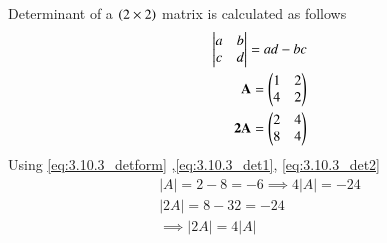 
 Determinant of a $\left(2 \times 2\right)$ matrix is calculated as follows
\begin{align}
\begin{vmatrix} a & b \\ c & d \end{vmatrix} = ad-bc
\label{eq:3.10.3_detform}
\\
\mathbf{A}=\begin{pmatrix}1&2\\4&2\end{pmatrix}
\label{eq:3.10.3_det1}
\\
\mathbf{2A}=\begin{pmatrix}2&4\\8&4\end{pmatrix}
\label{eq:3.10.3_det2}
\end{align}
Using \eqref{eq:3.10.3_detform} ,\eqref{eq:3.10.3_det1}, \eqref{eq:3.10.3_det2}
\begin{align}
|A|=2-8=-6 \implies 4|A|=-24
\\
|2A|= 8-32=-24
\\
\implies |2A|=4|A|
\end{align}
